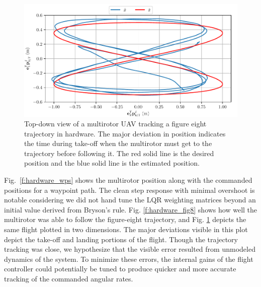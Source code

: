 \begin{figure}
  \centering
  \includegraphics[width=6.5in]{figures/mocap_fig8_position_2d}
  \caption[Top-Down View of LQR Hardware Trajectory Results]{Top-down view of a multirotor UAV tracking a figure eight
  trajectory in hardware. The major deviation in position indicates the time
during take-off when the multirotor must get to the trajectory before following
it. The red solid line is the desired position and the blue solid line is the
estimated position.}
  \label{f:hardware_fig8_2d}
\end{figure}

Fig.~\ref{f:hardware_wps} shows the multirotor position along with the commanded
positions for a waypoint path. The clean step response with minimal overshoot is
notable considering we did not hand tune the LQR weighting matrices beyond an initial value
derived from Bryson's rule. Fig. \ref{f:hardware_fig8} shows how well the
multirotor was able to follow the figure-eight trajectory, and Fig.
\ref{f:hardware_fig8_2d} depicts the same flight plotted in two dimensions. The
major deviations visible in this plot depict the take-off and landing portions
of the flight. Though the trajectory tracking was close, we hypothesize that the
visible error resulted from unmodeled dynamics of the system.
To minimize these errors, the internal gains
of the flight controller could potentially be tuned to produce quicker and more accurate
tracking of the commanded angular rates.
